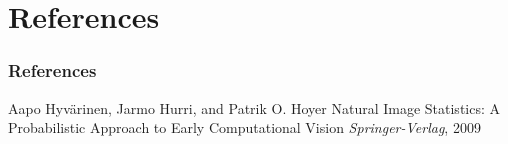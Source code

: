 \documentclass{beamer}
\begin{document}
%
%
%
%
%
%
%
%
%
%

\section{References}

\begin{frame}
\frametitle{References}
\footnotesize{
\begin{thebibliography}{09}
 Aapo Hyvärinen, Jarmo Hurri, and Patrik O. Hoyer
\newblock Natural Image Statistics: A Probabilistic Approach to Early Computational Vision
\newblock \emph{Springer-Verlag}, 2009
\end{thebibliography}
}
\end{frame}
\end{document}
